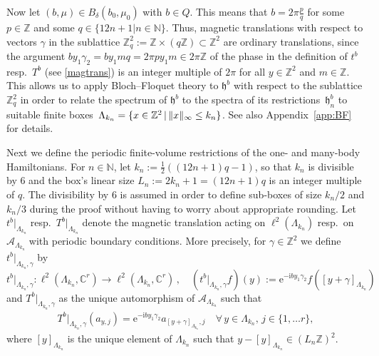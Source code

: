 \documentclass[a4paper]{article}
\newcommand{\fd}{r}
\newcommand{\g}{\gamma}
\newcommand{\La}{\Lambda}
\newcommand{\N}{\mathbb{N}}
\newcommand{\Z}{\mathbb{Z}}
\newcommand{\C}{\mathbb{C}}
\newcommand{\mA}{\mathcal{A}}
\DeclarePairedDelimiter\norm{\lVert}{\rVert}
\theoremstyle{plain}
\theoremstyle{definition}
\theoremstyle{remark}
\renewcommand{\(}{\left(}
\renewcommand{\)}{\right)}
\begin{document}
Now let $(b,\mu)\in B_\delta(b_0,\mu_0)$ with $b\in Q$. This means that $ b=2\pi\frac{p}{q}$ for some  $p\in\Z$ and some   $q\in \{12n+1|n\in\N\}$. 
Thus, magnetic translations with respect to vectors $\gamma$ in the sublattice $\Z^2_q:= \Z\times (q \Z)\subset \Z^2$ are ordinary translations, since the argument $b y_1 \gamma_2= by_1 m q= 2\pi p y_1 m\in 2\pi\Z$ of the phase in the definition of $t^b$ resp.\ $T^b$ (see \eqref{magtrans}) is an integer multiple of $2\pi$ for all $y\in\Z^2$ and $m\in\Z$. This allows us to apply Bloch--Floquet theory to $\mathfrak{h}^b$ with respect to the sublattice $\Z^2_q$ in order to relate the spectrum of $\mathfrak{h}^b$ to the spectra of its restrictions~$\mathfrak{h}_n^b$ to suitable finite boxes~$\Lambda_{k_n}  = \{x\in \Z^2 \, | \, \norm{x}_\infty \leq k_n \}$.  See also Appendix~\ref{app:BF} for details.

Next we define the periodic finite-volume restrictions of the one- and many-body Hamiltonians.
For $n\in\N$, let $k_n:= \frac{1}{2}((12n+1)q-1) $, so that $k_n$ is divisible by 6 and the box's linear size $L_n:= 2k_n+1= (12n+1)q$ is an integer multiple of $q$. The divisibility by 6 is assumed in order to define sub-boxes of size $k_n/2$
and $k_n/3$ during the proof without having to worry about appropriate rounding.
Let $t^b|_{\Lambda_{k_n}}$ resp.\ $T^b|_{\Lambda_{k_n}}$ denote the magnetic translation acting on $\ell^2(\Lambda_{k_n})$ resp.\  on $\mA_{\La_{k_n}}$ with periodic boundary conditions.
More precisely,  for $\g \in \Z^2$ we define 
$t^b|_{{\Lambda_{k_n},\gamma}}$ by 
\[
t^b|_{{\Lambda_{k_n}},\g}: \ell^2(\Lambda_{k_n},\C^\fd) \to \ell^2(\Lambda_{k_n},\C^\fd)\,,\quad  (t^b|_{{\Lambda_{k_n}},\g} f)(y) := \mathrm{e}^{-\mathrm{i}b y_1 \gamma_2} f([y+\gamma]_{\Lambda_{k_n}})
\]
and 
$T^b|_{{\Lambda_{k_n}},\g}$ as the unique automorphism of $\mA_{\La_{k_n}}$ such that 
\begin{align*}
T^b|_{{\Lambda_{k_n}},\g} (a_{y,j}) = \mathrm{e}^{-\mathrm{i}b y_1 \gamma_2} a_{[y+\gamma]_{\Lambda_{k_n}},j} \quad \forall\, y\in \Lambda_{k_n},\, j \in \{1,\dots \fd\},
\end{align*}
where $[y]_{\Lambda_{k_n}}$ is the unique element of $\Lambda_{k_n}$ such that $y-[y]_{\Lambda_{k_n}} \in (L_n\Z)^2$.
\end{document}
